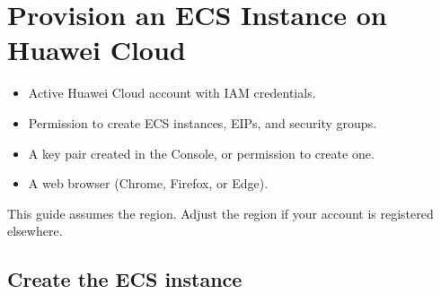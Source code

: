 \documentclass[english]{guide}
\begin{document}
\makecover

\sumario

\startbody

\section{Provision an ECS Instance on Huawei Cloud}

\begin{objetivos}

  \prerequisitos
  \begin{itemize}
    \item Active Huawei Cloud account with IAM credentials.
    \item Permission to create ECS instances, EIPs, and security groups.
    \item A key pair created in the Console, or permission to create one.
    \item A web browser (Chrome, Firefox, or Edge).
  \end{itemize}
\end{objetivos}

\begin{infobox}
This guide assumes the  region. Adjust the region if your
account is registered elsewhere.
\end{infobox}

\subsection{Create the ECS instance}

\end{document}
